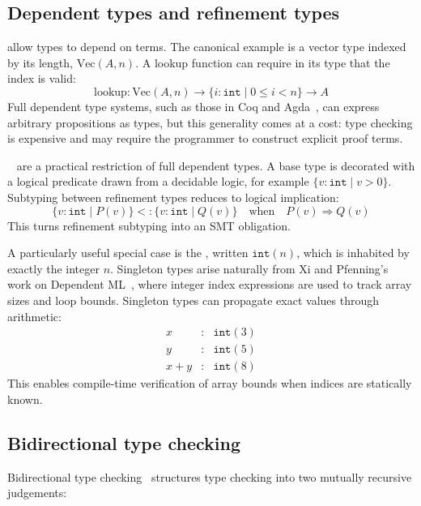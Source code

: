 \subsection{Dependent types and refinement types}\label{sec:dependent-types}

 allow types to depend on terms. The canonical example is a vector type indexed by its length, $\mathrm{Vec}(A, n)$. A lookup function can require in its type that the index is valid:
\[
  \mathrm{lookup} :
  \mathrm{Vec}(A,n) \to
  \{i\!:\!\mathtt{int} \mid 0 \le i < n\} \to A
\]
Full dependent type systems, such as those in Coq and Agda~\cite{Bove2009Agda}, can express arbitrary propositions as types, but this generality comes at a cost: type checking is expensive and may require the programmer to construct explicit proof terms.

~\cite{Rondon2008Liquid} are a practical restriction of full dependent types. A base type is decorated with a logical predicate drawn from a decidable logic, for example $\{v\!:\!\mathtt{int} \mid v > 0\}$. Subtyping between refinement types reduces to logical implication:
\[
  \{v\!:\!\mathtt{int} \mid P(v)\}
  <:
  \{v\!:\!\mathtt{int} \mid Q(v)\}
  \quad\text{when}\quad
  P(v) \Rightarrow Q(v)
\]
This turns refinement subtyping into an SMT obligation.

A particularly useful special case is the , written $\mathtt{int}(n)$, which is inhabited by exactly the integer $n$. Singleton types arise naturally from Xi and Pfenning's work on Dependent ML~\cite{Xi1999DML}, where integer index expressions are used to track array sizes and loop bounds. Singleton types can propagate exact values through arithmetic:
\[
  \begin{array}{rcl}
    x &:& \mathtt{int}(3) \\
    y &:& \mathtt{int}(5) \\
    x + y &:& \mathtt{int}(8)
  \end{array}
\]
This enables compile-time verification of array bounds when indices are statically known.

\subsection{Bidirectional type checking}

Bidirectional type checking~\cite{Pierce2000Local} structures type checking into two mutually recursive judgements:

